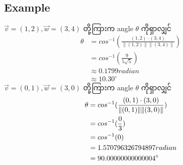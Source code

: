 \subsection{Example}
$\vec{v}=(1,2),\vec{w}=(3,4)$ တို့ကြားက angle $\theta$ ကိုရှာလျှင်
\[
    \begin{split}
        \theta&=cos^{-1}(\frac{(1,2)\cdot(3,4)}{\|(1,2)\|\|(3,4)\|}) \\
        &=cos^{-1}(\frac{9}{5\sqrt{5}}) \\
        &\approx 0.1799 radian \\
        &\approx 10.30^{\circ}
    \end{split}
\]
$\vec{v}=(0,1),\vec{w}=(3,0)$ တို့ကြားက angle $\theta$ ကိုရှာလျှင်
\[
    \begin{split}
        \theta&=cos^{-1}(\frac{(0,1)\cdot(3,0)}{\|(0,1)\|\|(3,0)\|}) \\
        &=cos^{-1}(\frac{0}{3}) \\
        &=cos^{-1}(0) \\
        &= {\fpeval{acos(0)}} radian \\
        &= {\fpeval{1.570796326794897*180/pi}}^{\circ}
    \end{split}
\]